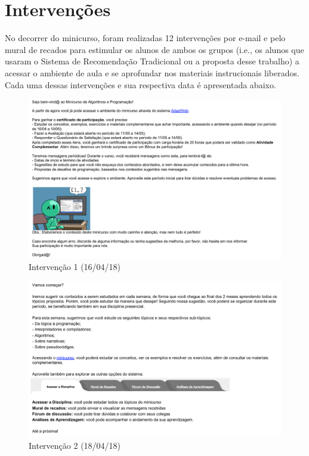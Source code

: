 \chapter{Intervenções}\label{ape:intervencoes}

No decorrer do minicurso, foram realizadas 12 intervenções por e-mail e pelo mural
de recados para estimular os alunos de ambos os grupos (i.e., os alunos que usaram o Sistema de Recomendação Tradicional
ou a proposta desse trabalho) a acessar o ambiente de aula e se aprofundar nos materiais instrucionais
liberados. Cada uma dessas intervenções e sua respectiva data é apresentada abaixo.

\begin{figure}[htb]
  \caption{\label{fig:intervencao-1}Intervenção 1 (16/04/18)}
  \begin{center}
      \includegraphics[scale=0.6]{./Figuras/intervencao-1.png}
  \end{center}
\end{figure}

\begin{figure}[htb]
  \caption{\label{fig:intervencao-2}Intervenção 2 (18/04/18)}
  \begin{center}
      \includegraphics[scale=0.6]{./Figuras/intervencao-2.png}
  \end{center}
\end{figure}

